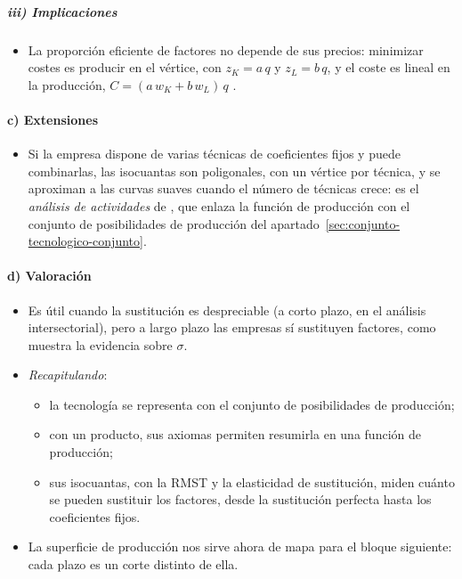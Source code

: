 \documentclass[11pt]{article}
\begin{document}
\subparagraph{iii) Implicaciones}

\begin{itemize}
\item La proporción eficiente de factores no depende de sus precios: minimizar costes es producir en el vértice, con $z_K=a\,q$ y $z_L=b\,q$, y el coste es lineal en la producción, $C=(a\,w_K+b\,w_L)\,q$ .
\end{itemize}

\paragraph{c) Extensiones}

\begin{itemize}
\item Si la empresa dispone de varias técnicas de coeficientes fijos y puede combinarlas, las isocuantas son poligonales, con un vértice por técnica, y se aproximan a las curvas suaves cuando el número de técnicas crece: es el \emph{análisis de actividades} de \textcite{Koopmans1951Activity}, que enlaza la función de producción con el conjunto de posibilidades de producción del apartado~\ref{sec:conjunto-tecnologico-conjunto}.
\end{itemize}

\paragraph{d) Valoración}

\begin{itemize}
\item Es útil cuando la sustitución es despreciable (a corto plazo, en el análisis intersectorial), pero a largo plazo las empresas sí sustituyen factores, como muestra la evidencia sobre $\sigma$.
\end{itemize}

\begin{itemize}
\item \emph{Recapitulando}:
  \begin{itemize}
  \item la tecnología se representa con el conjunto de posibilidades de producción;
  \item con un producto, sus axiomas permiten resumirla en una función de producción;
  \item sus isocuantas, con la RMST y la elasticidad de sustitución, miden cuánto se pueden sustituir los factores, desde la sustitución perfecta hasta los coeficientes fijos.
  \end{itemize}
\item La superficie de producción nos sirve ahora de mapa para el bloque siguiente: cada plazo es un corte distinto de ella.
\end{itemize}
\end{document}
